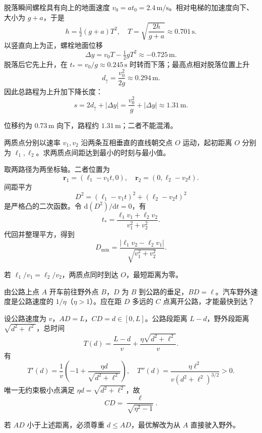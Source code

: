 \exsolution
脱落瞬间螺栓具有向上的地面速度 $v_0=at_0=2.4\,\mathrm{m/s}$。相对电梯的加速度向下、大小为 $g+a$，于是
\[
h=\tfrac12(g+a)T^2,\quad
\boxed{T=\sqrt{\frac{2h}{g+a}}\approx0.701\,\mathrm s}.
\]
以竖直向上为正，螺栓地面位移
\[
\Delta y=v_0T-\tfrac12gT^2\approx-0.725\,\mathrm m.
\]
脱落后它先上升，在 $t_*=v_0/g\approx0.245\,\mathrm s$ 时转而下落；最高点相对脱落位置上升
\[
d_\uparrow=\frac{v_0^2}{2g}\approx0.294\,\mathrm m.
\]
因此总路程为上升加下降长度：
\[
\boxed{s=2d_\uparrow+|\Delta y|
=\frac{v_0^2}{g}+|\Delta y|\approx1.31\,\mathrm m.}
\]

\excheck
位移约为 $0.73\,\mathrm m$ 向下，路程约 $1.31\,\mathrm m$；二者不能混淆。


两质点分别以速率 $v_1,v_2$ 沿两条互相垂直的直线朝交点 $O$ 运动，起初距离 $O$ 分别为 $\ell_1,\ell_2$。求两质点间距达到最小的时刻与最小值。

\exsolution
取两路径为两坐标轴。二者位置为
\[
\bm r_1=(\ell_1-v_1t,0),\quad \bm r_2=(0,\ell_2-v_2t).
\]
间距平方
\[
D^2=(\ell_1-v_1t)^2+(\ell_2-v_2t)^2
\]
是严格凸的二次函数。令 $\mathrm d(D^2)/\mathrm dt=0$，有
\[
\boxed{t_*=\frac{\ell_1v_1+\ell_2v_2}{v_1^2+v_2^2}.}
\]
代回并整理平方，得到
\[
\boxed{D_{\min}=\frac{|\ell_1v_2-\ell_2v_1|}
{\sqrt{v_1^2+v_2^2}}.}
\]

\excheck
若 $\ell_1/v_1=\ell_2/v_2$，两质点同时到达 $O$，最短距离为零。


由公路上点 $A$ 开车前往野外点 $B$，$D$ 为 $B$ 到公路的垂足，$BD=\ell$。汽车野外速度是公路速度的 $1/\eta$（$\eta>1$）。应在距 $D$ 多远的 $C$ 点离开公路，才能最快到达？
\begin{center}
\end{center}

\exsolution
设公路速度为 $v$，$AD=L$，$CD=d\in[0,L]$。公路段距离 $L-d$，野外段距离 $\sqrt{d^2+\ell^2}$，总时间
\[
T(d)=\frac{L-d}{v}+\frac{\eta\sqrt{d^2+\ell^2}}{v}.
\]
有
\[
T'(d)=\frac1v\left(-1+\frac{\eta d}{\sqrt{d^2+\ell^2}}\right),\quad
T''(d)=\frac{\eta\ell^2}{v(d^2+\ell^2)^{3/2}}>0.
\]
唯一无约束极小点满足 $\eta d=\sqrt{d^2+\ell^2}$，故
\[
\boxed{CD=\frac{\ell}{\sqrt{\eta^2-1}}.}
\]

\excheck
若 $AD$ 小于上述距离，必须尊重 $d\le AD$，最优解改为从 $A$ 直接驶入野外。


